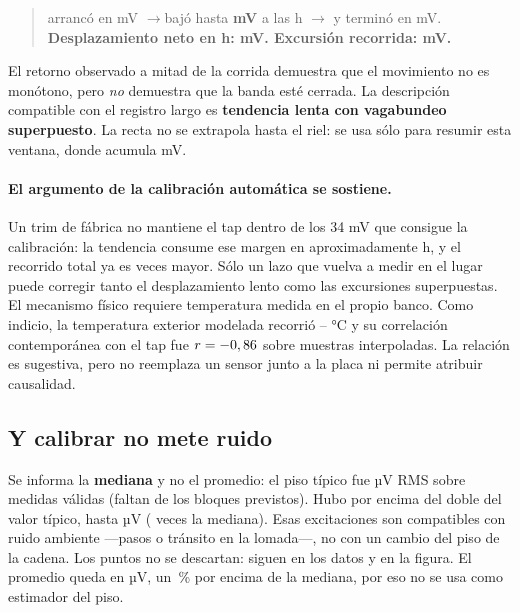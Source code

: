 \documentclass[11pt,a4paper]{article}
\begin{document}
\begin{quote}
arrancó en \derivaArranco{} mV \quad$\rightarrow$\quad bajó hasta
\textbf{\derivaExtremo{} mV} a las \derivaExtremoH{} h \quad$\rightarrow$\quad
y terminó en \derivaAhora{} mV.\\[1mm]
\textbf{Desplazamiento neto en \derivaHoras{} h: \derivaNeto{} mV. Excursión
recorrida: \derivaBanda{} mV.}
\end{quote}

El retorno observado a mitad de la corrida demuestra que el movimiento no es
monótono, pero \emph{no} demuestra que la banda esté cerrada. La descripción
compatible con el registro largo es \textbf{tendencia lenta con vagabundeo
superpuesto}. La recta no se extrapola hasta el riel: se usa sólo para resumir
esta ventana, donde acumula \derivaRectaSignada{} mV.

\paragraph{El argumento de la calibración automática se sostiene.} Un trim de
fábrica no mantiene el tap dentro de los 34 mV que consigue la calibración: la
tendencia consume ese margen en aproximadamente \derivaCome{} h, y el recorrido
total ya es \derivaVeces{} veces mayor. Sólo un lazo que vuelva a medir en el
lugar puede corregir tanto el desplazamiento lento como las excursiones
superpuestas. El mecanismo físico requiere temperatura medida en el propio
banco. Como indicio, la temperatura exterior modelada recorrió
\tempMin--\tempMax{} °C y su correlación contemporánea con el tap fue
$r=-0,86{}$ sobre \tempN{} muestras interpoladas. La relación es sugestiva,
pero no reemplaza un sensor junto a la placa ni permite atribuir causalidad.

\subsection{Y calibrar no mete ruido}

Se informa la \textbf{mediana} y no el promedio: el piso típico fue
\ruidoRms{} µV RMS sobre \ruidoN{} medidas válidas
(faltan \ruidoFaltante{} de los \ruidoEsperado{} bloques previstos). Hubo
\ruidoPicos{} por encima del doble del valor típico, hasta \ruidoMax{} µV
(\ruidoVecesMax{} veces la mediana). Esas excitaciones son compatibles con
ruido ambiente ---pasos o tránsito en la lomada---, no con un cambio del piso
de la cadena. Los puntos no se descartan: siguen en los datos y en la figura.
El promedio queda en \ruidoPromedio{} µV, un \ruidoSesgoPromedio{}\,\% por
encima de la mediana, por eso no se usa como estimador del piso.
\end{document}
